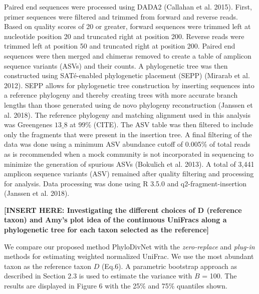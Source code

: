 \documentclass{article}
\newcommand*{\myfont}{\fontfamily{lmtt}\selectfont}
\begin{document}
Paired end sequences were processed using DADA2 (Callahan et al. 2015). First, primer sequences were filtered and trimmed from forward and reverse reads. Based on quality scores of 20 or greater, forward sequences were trimmed left at nucleotide position 20 and truncated right at position 200. Reverse reads were trimmed left at position 50 and truncated right at position 200. Paired end sequences were then merged and chimeras removed to create a table of amplicon sequence variants (ASVs) and their counts. A phylogenetic tree was then constructed using SAT\'{e}-enabled phylogenetic placement (SEPP) (Mirarab et al. 2012). SEPP allows for phylogenetic tree construction by inserting sequences into a reference phylogeny and thereby creating trees with more accurate branch lengths than those generated using de novo phylogeny reconstruction (Janssen et al. 2018). The reference phylogeny and matching alignment used in this analysis was Greengenes $13\_8$ at $99\%$ (CITE). The ASV table was then filtered to include only the fragments that were present in the insertion tree. A final filtering of the data was done using a minimum ASV abundance cutoff of 0.005\% of total reads as is recommended when a mock community is not incorporated in sequencing to minimize the generation of spurious ASVs (Bokulich et al. 2013). A total of 3,441 amplicon sequence variants (ASV) remained after quality filtering and processing for analysis. Data processing was done using R 3.5.0 and q2-fragment-insertion (Janssen et al. 2018).

\textbf{[INSERT HERE: Investigating the different choices of D (reference taxon) and Amy's plot idea of the continuous UniFracs along a phylogenetic tree for each taxon selected as the reference]}

We compare our proposed method {\myfont PhyloDivNet} with the \textit{zero-replace} and \textit{plug-in} methods for estimating weighted normalized UniFrac. We use the most abundant taxon as the reference taxon $D$ (Eq.6). A parametric bootstrap approach as described in Section 2.3 is used to estimate the variance with $B$ = 100. The results are displayed in Figure 6 with the 25\% and 75\% quantiles shown.
\end{document}
